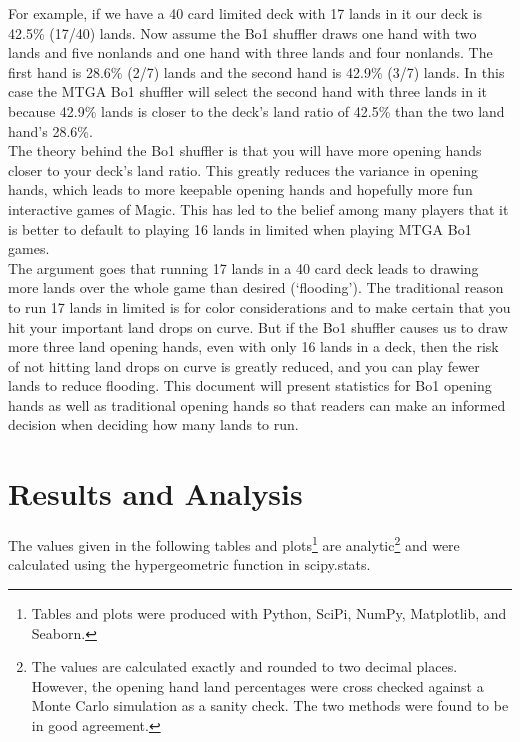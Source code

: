 \documentclass[oneside]{book}   %
\begin{document}
For example, if we have a 40 card limited deck with 17 lands in it our deck is 42.5\% (17/40) lands. Now assume the Bo1 shuffler draws one hand with two lands and five nonlands and one hand with three lands and four nonlands. The first hand is 28.6\% (2/7) lands and the second hand is 42.9\% (3/7) lands. In this case the MTGA Bo1 shuffler will select the second hand with three lands in it because 42.9\% lands is closer to the deck's land ratio of 42.5\% than the two land hand's 28.6\%. \\

The theory behind the Bo1 shuffler is that you will have more opening hands closer to your deck's land ratio. This greatly reduces the variance in opening hands, which leads to more keepable opening hands and hopefully more fun interactive games of Magic. This has led to the belief among many players that it is better to default to playing 16 lands in limited when playing MTGA Bo1 games. \\

The argument goes that running 17 lands in a 40 card deck leads to drawing more lands over the whole game than desired (`flooding'). The traditional reason to run 17 lands in limited is for color considerations and to make certain that you hit your important land drops on curve. But if the Bo1 shuffler causes us to draw more three land opening hands, even with only 16 lands in a deck, then the risk of not hitting land drops on curve is greatly reduced, and you can play fewer lands to reduce flooding. This document will present statistics for Bo1 opening hands as well as traditional opening hands so that readers can make an informed decision when deciding how many lands to run.

\chapter{Results and Analysis}
\label{results}

The values given in the following tables and plots\footnote{Tables and plots were produced with Python, SciPi, NumPy, Matplotlib, and Seaborn.} are analytic\footnote{The values are calculated exactly and rounded to two decimal places. However, the opening hand land percentages were cross checked against a Monte Carlo simulation as a sanity check. The two methods were found to be in good agreement.} and were calculated using the hypergeometric function in scipy.stats.  %
\end{document}
